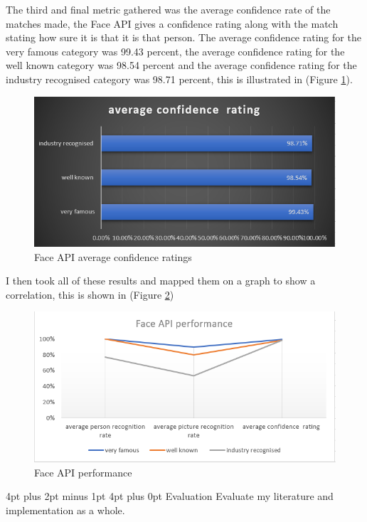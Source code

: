 \documentclass[12pt,a4paper]{article}
\makeatletter
\renewcommand\section{\@startsection {section}{1}{0mm} %
                               {4pt plus 2pt minus 1pt} %
                               {4pt plus 0pt} %
                               {\bfseries}}
\makeatother
\begin{document}
The third and final metric gathered was the average confidence rate of the matches made, the Face API gives a confidence rating along with the match stating how sure it is that it is that person. The average confidence rating for the very famous category was 99.43 percent, the average confidence rating for the well known category was 98.54 percent and the average confidence rating for the industry recognised category was 98.71 percent, this is illustrated in (Figure \ref{fer3}). 

\begin{figure}[h]
    \centering
    \includegraphics[width=1.0\textwidth]{Figs/faceevalr3.PNG} 
    \caption{Face API average confidence ratings} 
    \label{fer3}
\end{figure} 

I then took all of these results and mapped them on a graph to show a correlation, this is shown in (Figure \ref{fer4}) 

\begin{figure}[h]
    \centering
    \includegraphics[width=1.0\textwidth]{Figs/faceevalr4.PNG} 
    \caption{Face API performance} 
    \label{fer4}
\end{figure}

\section{Evaluation}
Evaluate my literature and implementation as a whole. 
\end{document}
